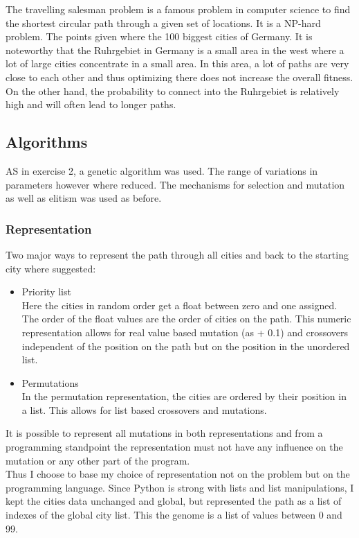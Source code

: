 \documentclass{scrartcl}
\begin{document}
The travelling salesman problem is a famous problem in computer science to find the shortest circular path through a given set of locations. It is a NP-hard problem. The points given where the 100 biggest cities of Germany. It is noteworthy that the Ruhrgebiet in Germany is a small area in the west where a lot of large cities concentrate in a small area. In this area, a lot of paths are very close to each other and thus optimizing there does not increase the overall fitness. On the other hand, the probability to connect into the Ruhrgebiet is relatively high and will often lead to longer paths.

\subsection{Algorithms}
AS in exercise 2, a genetic algorithm was used. The range of variations in parameters however where reduced. The mechanisms for selection and mutation as well as elitism was used as before.

\subsubsection{Representation}
Two major ways to represent the path through all cities and back to the starting city where suggested:
\begin{itemize}
\item Priority list\\
Here the cities in random order get a float between zero and one assigned. The order of the float values are the order of cities on the path. This numeric representation allows for real value based mutation (as + 0.1) and crossovers independent of the position on the path but on the position in the unordered list.
\item Permutations\\
In the permutation representation, the cities are ordered by their position in a list. This allows for list based crossovers and mutations.
\end{itemize}

It is possible to represent all mutations in both representations and from a programming standpoint the representation must not have any influence on the mutation or any other part of the program.\\
Thus I choose to base my choice of representation not on the problem but on the programming language. Since Python is strong with lists and list manipulations, I kept the cities data unchanged and global, but represented the path as a list of indexes of the global city list. This the genome is a list of values between 0 and 99.
\end{document}
